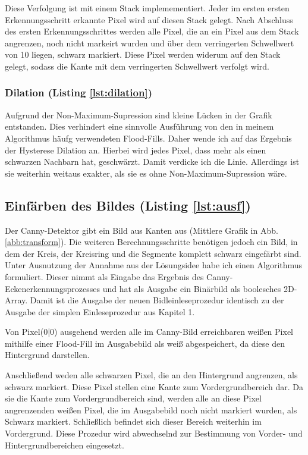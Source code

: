 Diese Verfolgung ist mit einem Stack implemementiert. Jeder im ersten ersten Erkennungsschritt erkannte Pixel wird auf diesen Stack gelegt. Nach Abschluss des ersten Erkennungsschrittes werden alle Pixel, die an ein Pixel aus dem Stack angrenzen, noch nicht markeirt wurden und über dem verringerten Schwellwert von 10 liegen, schwarz markiert. Diese Pixel werden widerum auf den Stack gelegt, sodass die Kante mit dem verringerten Schwellwert verfolgt wird. 

\subsubsection{Dilation (Listing \ref{lst:dilation})}
Aufgrund der Non-Maximum-Supression sind kleine Lücken in der Grafik entstanden. Dies verhindert eine sinnvolle Ausführung von den in meinem Algorithmus häufg verwendeten Flood-Fills. Daher wende ich auf das Ergebnis der Hysterese Dilation an. Hierbei wird jedes Pixel, dass mehr als einen schwarzen Nachbarn hat, geschwärzt.
Damit verdicke ich die Linie. Allerdings ist sie weiterhin weitaus exakter, als sie es ohne Non-Maximum-Supression wäre.

\subsection{Einfärben des Bildes (Listing \ref{lst:ausf})}
Der Canny-Detektor gibt ein Bild aus Kanten aus (Mittlere Grafik in Abb. \ref{abb:transform}). Die weiteren Berechnungsschritte benötigen jedoch ein Bild, in dem der Kreis, der Kreisring und die Segmente komplett schwarz eingefärbt sind. Unter Ausnutzung der Annahme aus der Lösungsidee habe ich einen Algorithmus formuliert.
Dieser nimmt als Eingabe das Ergebnis des Canny-Eckenerkennungsprozesses und hat als Ausgabe ein Binärbild als boolesches 2D-Array. Damit ist die Ausgabe der neuen Bidleinleseprozedur identisch zu der Ausgabe der simplen Einleseprozedur aus Kapitel 1.

Von Pixel(0|0) ausgehend werden alle im Canny-Bild erreichbaren weißen Pixel mithilfe einer Flood-Fill im Ausgabebild als weiß abgespeichert, da diese den Hintergrund darstellen.

Anschließend weden alle schwarzen Pixel, die an den Hintergrund angrenzen, als schwarz markiert. Diese Pixel stellen eine Kante zum Vordergrundbereich dar.
Da sie die Kante zum Vordergrundbereich sind, werden alle an diese Pixel angrenzenden weißen Pixel, die im Ausgabebild noch nicht markiert wurden, als Schwarz markiert. Schließlich befindet sich dieser Bereich weiterhin im Vordergrund.
Diese Prozedur wird abwechselnd zur Bestimmung von Vorder- und Hintergrundbereichen eingesetzt.

